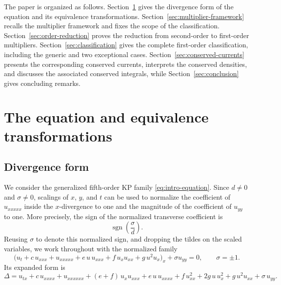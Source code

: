 \documentclass[11pt]{article}
\numberwithin{equation}{section}
\theoremstyle{definition}
\theoremstyle{remark}
\begin{document}
The paper is organized as follows.
Section~\ref{sec:equation} gives the divergence form of the equation
and its equivalence transformations.
Section~\ref{sec:multiplier-framework} recalls the multiplier
framework and fixes the scope of the classification.
Section~\ref{sec:order-reduction} proves the reduction from
second-order to first-order multipliers.
Section~\ref{sec:classification} gives the complete first-order
classification, including the generic and two exceptional cases.
Section~\ref{sec:conserved-currents} presents the corresponding
conserved currents, interprets the conserved densities, and discusses
the associated conserved integrals, while
Section~\ref{sec:conclusion} gives concluding remarks.
\section{The equation and equivalence transformations}
\label{sec:equation}

\subsection{Divergence form}

We consider the generalized fifth-order KP family
\eqref{eq:intro-equation}. Since $d\neq0$ and $\sigma\neq0$, scalings
of $x$, $y$, and $t$ can be used to normalize the coefficient of
$u_{xxxxx}$ inside the $x$-divergence to one and the magnitude of the
coefficient of $u_{yy}$ to one. More precisely, the sign of the
normalized transverse coefficient is
\[
\operatorname{sgn}\left(\frac{\sigma}{d}\right).
\]
Reusing $\sigma$ to denote this normalized sign, and dropping the
tildes on the scaled variables, we work throughout with the
normalized family
\begin{equation}
\bigl(u_t+c\,u_{xxx}+u_{xxxxx}
+e\,u\,u_{xxx}+f\,u_xu_{xx}+g\,u^2u_x\bigr)_x
+\sigma u_{yy}=0,
\qquad
\sigma=\pm1.
\label{eq:normalized-equation}
\end{equation}
Its expanded form is
\begin{equation}
\Delta = u_{tx} + c\,u_{xxxx} + u_{xxxxxx}
+ (e+f)\,u_x u_{xxx} + e\,u\,u_{xxxx} + f\,u_{xx}^2
+ 2g\,u\,u_x^2 + g\,u^2 u_{xx} + \sigma\,u_{yy}.
\label{eq:Delta-expanded}
\end{equation}
\end{document}
